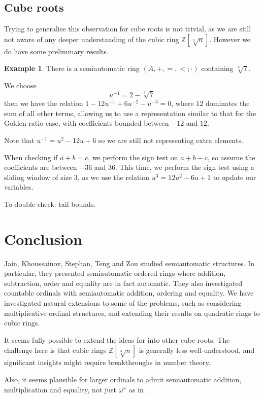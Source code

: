 \documentclass[british,a4paper,11pt,abstract=on]{scrreprt}
\theoremstyle{definition}
\newtheorem{example}[theorem]{Example}
\theoremstyle{remark}
\newcommand{\Z}{\mathbb{Z}}
\newcommand{\cbrt}[1]{\sqrt[3]{#1}}
\begin{document}
\section{Cube roots}

Trying to generalise this observation for cube roots is not trivial,
as we are still not aware of any deeper understanding of the cubic ring \(\Z[\sqrt[3]{n}]\).
However we do have some preliminary results.

\begin{example} \label{cube root 7}
    There is a semiautomatic ring \((A, +, =, <;\cdot)\) containing \(\cbrt{7}\).

    We choose \[ u^{-1} = 2 - \cbrt{7} \]
    then we have the relation \(1 - 12u^{-1} + 6u^{-2} - u^{-3} = 0\), where \(12\) dominates the sum of all other terms,
    allowing us to use a representation similar to that for the Golden ratio case, with coefficients bounded between \(-12\) and \(12\).

    Note that \(u^{-1} = u^2 - 12u + 6\) so we are still not representing extra elements.

    When checking if \(a + b = c\), we perform the sign test on \(a + b - c\), so assume the coefficients are between \(-36\) and \(36\).
    This time, we perform the sign test using a sliding window of size \(3\), as we use the relation \(u^3 = 12u^2 - 6u + 1\) to update our variables.

    To double check: tail bounds.
\end{example}



\chapter{Conclusion}

Jain, Khoussainov, Stephan, Teng and Zou \autocite{semiauto} studied semiautomatic structures.
In particular, they presented semiautomatic ordered rings where addition, subtraction, order and equality are in fact automatic.
They also investigated countable ordinals with semiautomatic addition, ordering and equality.
We have investigated natural extensions to some of the problems, such as considering multiplicative ordinal structures,
and extending their results on quadratic rings to cubic rings.

It seems fully possible to extend the ideas for  into other cube roots.
The challenge here is that cubic rings \(\Z[\cbrt{n}]\) is generally less well-understood,
and significant insights might require breakthroughs in number theory.

Also, it seems plausible for larger ordinals to admit semiautomatic addition, multiplication and equality, not just \(\omega^\omega\) as in .


\printbibliography
\end{document}
